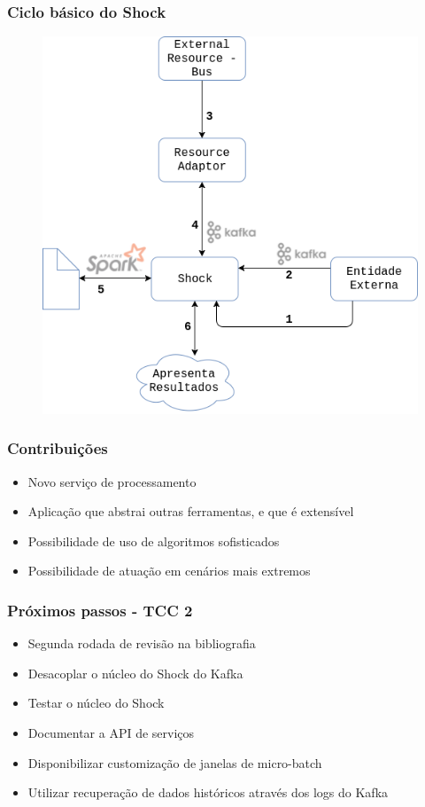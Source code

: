 \documentclass{beamer}
\begin{document}
  \begin{frame}
      \frametitle{Ciclo básico do Shock}
          \begin{figure}
              \includegraphics[scale=0.4]{figures/shock.png}
          \end{figure}
  \end{frame}

  \begin{frame}
      \frametitle{Contribuições}
      \begin{itemize}
          \item Novo serviço de processamento
          \item Aplicação que abstrai outras ferramentas, e que é extensível
          \item Possibilidade de uso de algoritmos sofisticados
          \item Possibilidade de atuação em cenários mais extremos
      \end{itemize}
  \end{frame}

  \begin{frame}
      \frametitle{Próximos passos - TCC 2}
      \begin{itemize}
          \item Segunda rodada de revisão na bibliografia
          \item Desacoplar o núcleo do Shock do Kafka
          \item Testar o núcleo do Shock
          \item Documentar a API de serviços
          \item Disponibilizar customização de janelas de micro-batch
          \item Utilizar recuperação de dados históricos através dos logs do Kafka
      \end{itemize}
  \end{frame}
\end{document}
